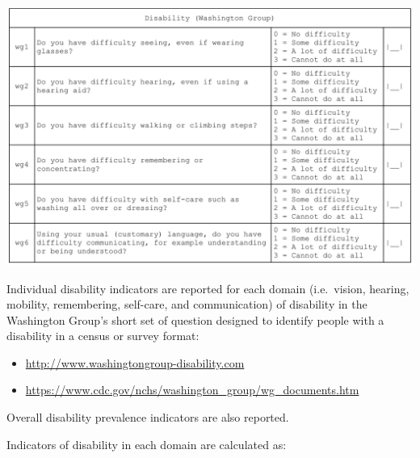 \documentclass[12pt,a4paper]{book}
\theoremstyle{definition}
\theoremstyle{definition}
\theoremstyle{definition}
\theoremstyle{remark}
\begin{document}
\begin{center}\includegraphics[width=23.94in]{figures/questionnaire04} \end{center}

\newpage

Individual disability indicators are reported for each domain
(i.e.~vision, hearing, mobility, remembering, self-care, and
communication) of disability in the Washington Group's short set of
question designed to identify people with a disability in a census or
survey format:

\begin{itemize}
\item
  \url{http://www.washingtongroup-disability.com}
\item
  \url{https://www.cdc.gov/nchs/washington_group/wg_documents.htm}
\end{itemize}

Overall disability prevalence indicators are also reported.

Indicators of disability in each domain are calculated as:
\end{document}
